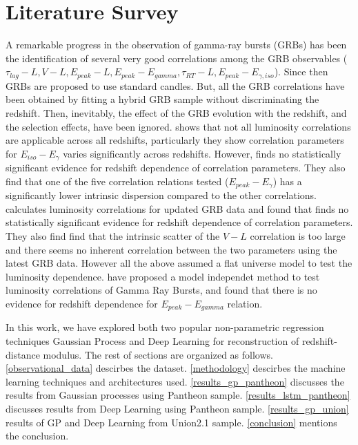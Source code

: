 \section{Literature Survey}
A remarkable progress in the observation of gamma-ray bursts (GRBs) has been the identification of several very good correlations among the GRB observables ($\tau_{lag} - L, V - L, E_{peak} - L, E_{peak} - E_{gamma}, \tau_{RT} - L, E_{peak} - E_{\gamma,iso}$)\cite{schaefer2007hubble}. Since then GRBs are proposed to use standard candles. But, all the GRB correlations have been obtained by fitting a hybrid GRB sample without discriminating the redshift. Then, inevitably, the effect of the GRB evolution with the redshift, and the selection effects, have been ignored. \cite{li2007variation} shows that not all luminosity correlations are applicable across all redshifts, particularly they show correlation parameters for $E_{iso}-E_{\gamma}$ varies significantly across redshifts. However, \cite{basilakos2008testing} finds no statistically significant evidence for redshift dependence of correlation parameters. They also find that one of the five correlation relations tested ($E_{peak}-E_{\gamma}$) has a significantly lower intrinsic dispersion compared to the other correlations. \cite{wang2011updated} calculates luminosity correlations for updated GRB data and found that finds no statistically significant evidence for redshift dependence of correlation parameters. They also find  find that the intrinsic scatter of the $V-L$ correlation is too large and there seems no inherent correlation between the two parameters using the latest GRB data. However all the above assumed a flat universe model to test the luminosity dependence. \cite{tang2021model} have proposed a model independet method to test luminosity correlations of Gamma Ray Bursts, and found that there is no evidence for redshift dependence for $E_{peak}-E_{gamma}$ relation.

In this work, we have explored both two popular non-parametric regression techniques Gaussian Process and Deep Learning for reconstruction of redshift-distance modulus. The rest of sections are organized as follows. \ref{observational_data} descirbes the dataset. \ref{methodology} descirbes the machine learning techniques and architectures used. \ref{results_gp_pantheon} discusses the results from Gaussian processes using Pantheon sample. \ref{results_lstm_pantheon} discusses results from Deep Learning using Pantheon sample. \ref{results_gp_union} results of GP and Deep Learning from Union2.1 sample. \ref{conclusion} mentions the conclusion.

